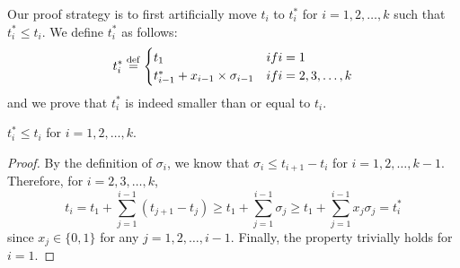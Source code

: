 Our proof strategy is to first artificially move $t_i$ to $t_i^*$ for $i=1,2,\ldots,k$ such that $t_i^*
\leq t_i$. We define $t_i^*$ as follows:
\begin{equation}
\label{eq:ti*}
t_i^* \equals
\begin{cases}
t_1 & \mbox{if } i=1 \\
t_{i-1}^*+ x_{i-1}\times\sigma_{i-1} & \mbox{if } i=2,3,\ldots,k \\
\end{cases}
\end{equation}
and we prove that $t_i^*$ is indeed smaller than or equal to $t_i$.
\begin{Lemma}
\label{lemma:ti*}
$t_i^* \leq t_i$ for $i=1,2,\ldots,k$.
\end{Lemma}
\begin{proof}
By the definition of $\sigma_i$, we know that $\sigma_i \leq t_{i+1}-t_i$ for $i=1,2,\ldots,k-1$.
Therefore,  for $i=2,3,\ldots,k$,%
\begin{equation*}
  t_i = t_1 + \sum_{j=1}^{i-1} (t_{j+1} - t_j) \geq t_1 + \sum_{j=1}^{i-1} \sigma_j \geq t_1 + \sum_{j=1}^{i-1} x_j \sigma_j = t_i^*
\end{equation*}
since $x_j \in \{0, 1\}$ for any $j=1,2,\ldots,i-1$. 
Finally, the property trivially holds for $i=1$. 
\end{proof}


 

